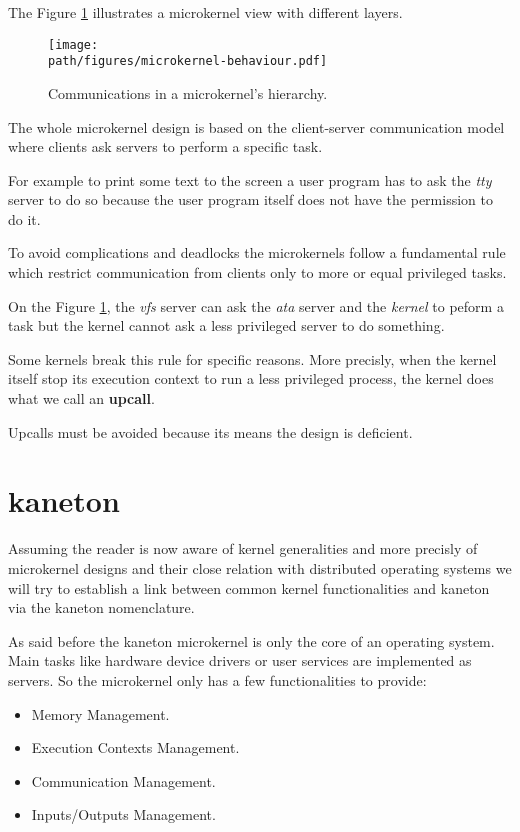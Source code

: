 The Figure \ref{figure:overview_microkernel} illustrates a microkernel
view with different layers.

\begin{figure}[h]
  \begin{center}
    \texttt{[image: \\path/figures/microkernel-behaviour.pdf]}
    \caption{Communications in a microkernel's hierarchy.}
    \label{figure:overview_microkernel}
  \end{center}
\end{figure}

The whole microkernel design is based on the client-server communication
model where clients ask servers to perform a specific task.

For example to print some text to the screen a user program has to
ask the \textit{tty} server to do so because the user program itself does
not have the permission to do it.

To avoid complications and deadlocks the microkernels follow a fundamental
rule which restrict communication from clients only to more or equal
privileged tasks.

On the Figure \ref{figure:overview_microkernel}, the \textit{vfs} server can
ask the \textit{ata} server and the \textit{kernel} to peform a task but
the kernel cannot ask a less privileged server to do something.

Some kernels break this rule for specific reasons. More precisly,
when the kernel itself stop its execution context to run a less
privileged process, the kernel does what we call an \textbf{upcall}.

Upcalls must be avoided because its means the design is deficient.

\section{kaneton}

Assuming the reader is now aware of kernel generalities and more
precisly of microkernel designs and their close relation with
distributed operating systems we will try to establish a link
between common kernel functionalities and kaneton via the
kaneton nomenclature.

As said before the kaneton microkernel is only the core of an
operating system. Main tasks like hardware device drivers or
user services are implemented as servers. So the microkernel
only has a few functionalities to provide:

\begin{itemize}
  \item
    Memory Management.
  \item
    Execution Contexts Management.
  \item
    Communication Management.
  \item
    Inputs/Outputs Management.
\end{itemize}

